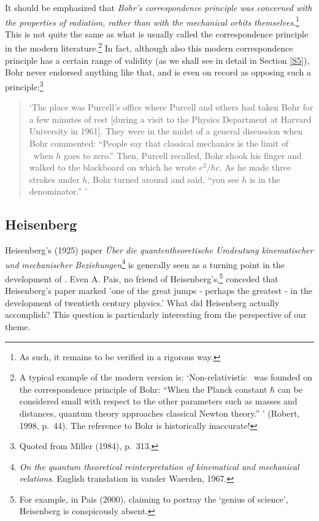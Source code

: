 \documentclass[12pt,titlepage]{article}
\begin{document}
It should be emphasized that {\it Bohr's correspondence principle was concerned with the properties of radiation, rather than with the mechanical orbits themselves}.\footnote{As such, it remains to be verified in a rigorous way.}
This  is not quite  the same as what is usually called the correspondence principle in the modern literature.\footnote{A typical example of the modern version is:  `Non-relativistic \qm\ was founded on the correspondence principle of Bohr: ``When the Planck constant $\hbar$ can be considered small with respect to the other parameters such as masses and distances, quantum theory approaches classical Newton theory.'' '  (Robert, 1998, p.\ 44). The reference to Bohr is historically inaccurate!} In fact, although also this modern correspondence principle has a certain range of validity (as we shall see in detail in Section \ref{S5}), Bohr never endorsed anything like that, and is even on record as opposing such a principle:\footnote{Quoted from Miller (1984), p.\ 313.}
\begin{quote}
`The place was Purcell's office where Purcell and others had taken Bohr for a few minutes of rest [during a visit to the Physics Department at Harvard University in 1961]. They were in the midst of a general discussion when Bohr commented: ``People say that classical mechanics is the limit of \qm\ when $h$ goes to zero.'' Then, Purcell recalled, Bohr shook his finger and walked to the blackboard on which he wrote $e^2/hc$. As he made three strokes under $h$, Bohr turned around and said, ``you see $h$ is in the denominator.'' '  
\end{quote} 
\subsection{Heisenberg}\label{heis}
Heisenberg's (1925) paper \textit{\"{U}ber die quantentheoretische Umdeutung kinematischer und mechanischer Beziehungen}\footnote{\textit{On the quantum theoretical reinterpretation of kinematical and mechanical relations}.  English translation in  vander Waerden, 1967.} is generally seen as a turning point in the development of \qm. Even A. Pais, no friend of Heisenberg's,\footnote{For example, in Pais (2000), claiming to portray the `genius of science', Heisenberg is conspicously absent.}  conceded that  Heisenberg's paper marked  'one of the great jumps - perhaps the greatest - in the development of twentieth century physics.' What did Heisenberg actually accomplish? This question is particularly interesting from the perspective of our theme.
\end{document}
